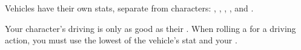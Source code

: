 
Vehicles have their own stats, separate from characters: , , , ,  and .

Your character's driving is only as good as their . When rolling a for a driving action, you must use the lowest of the vehicle's stat and your .
